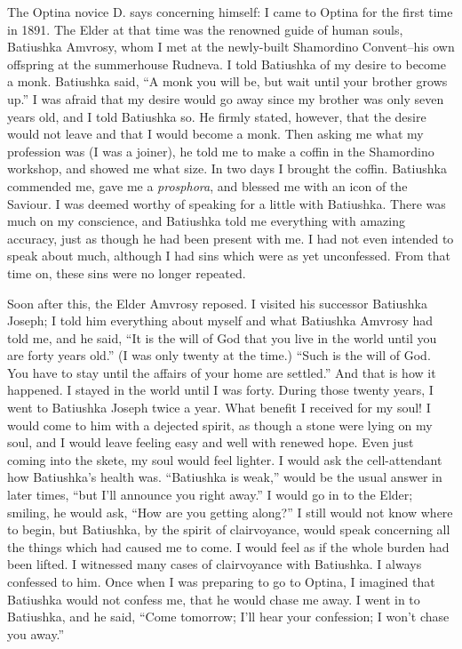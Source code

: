 \begin{longquote}{The Optina novice D. says concerning himself:}
I came to Optina for the first time in 1891. The Elder at that time was the renowned guide of human souls, Batiushka Amvrosy, whom I met at the newly-built Shamordino Convent--his own offspring at the summerhouse Rudneva. I told Batiushka of my desire to become a monk. Batiushka said, ``A monk you will be, but wait until your brother grows up.'' I was afraid that my desire would go away since my brother was only seven years old, and I told Batiushka so. He firmly stated, however, that the desire would not leave and that I would become a monk. Then asking me what my profession was (I was a joiner), he told me to make a coffin in the Shamordino workshop, and showed me what size. In two days I brought the coffin. Batiushka commended me, gave me a \textit{prosphora}, and blessed me with an icon of the Saviour. I was deemed worthy of speaking for a little with Batiushka. There was much on my conscience, and Batiushka told me everything with amazing accuracy, just as though he had been present with me. I had not even intended to speak about much, although I had sins which were as yet unconfessed. From that time on, these sins were no longer repeated.

Soon after this, the Elder Amvrosy reposed. I visited his successor Batiushka Joseph; I told him everything about myself and what Batiushka Amvrosy had told me, and he said, ``It is the will of God that you live in the world until you are forty years old.'' (I was only twenty at the time.) ``Such is the will of God. You have to stay until the affairs of your home are settled.'' And that is how it happened. I stayed in the world until I was forty. During those twenty years, I went to Batiushka Joseph twice a year. What benefit I received for my soul! I would come to him with a dejected spirit, as though a stone were lying on my soul, and I would leave feeling easy and well with renewed hope. Even just coming into the skete, my soul would feel lighter. I would ask the cell-attendant how Batiushka's health was. ``Batiushka is weak,'' would be the usual answer in later times, ``but I'll announce you right away.'' I would go in to the Elder; smiling, he would ask, ``How are you getting along?'' I still would not know where to begin, but Batiushka, by the spirit of clairvoyance, would speak concerning all the things which had caused me to come. I would feel as if the whole burden had been lifted. I witnessed many cases of clairvoyance with Batiushka. I always confessed to him. Once when I was preparing to go to Optina, I imagined that Batiushka would not confess me, that he would chase me away. I went in to Batiushka, and he said, ``Come tomorrow; I'll hear your confession; I won't chase you away.''


\end{longquote}
